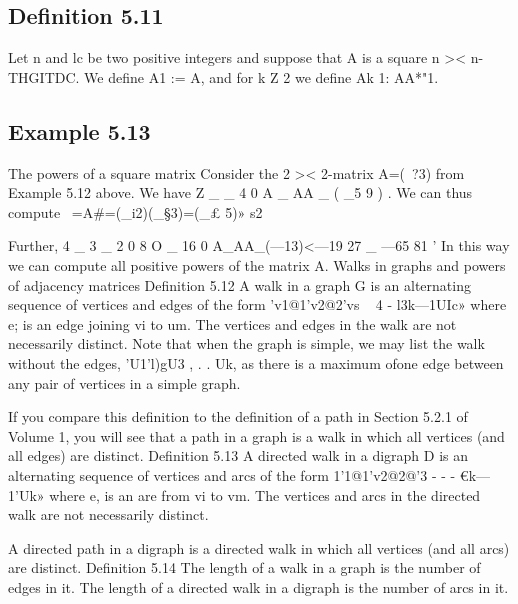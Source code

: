 ﻿\documentclass{beamer}
\begin{document}
\subsection*{Definition 5.11} Let n and lc be two positive integers and suppose that A
is a square n >< n-THGITDC. We deﬁne
A1 := A,
and for k Z 2 we deﬁne
Ak 1: AA*"1.
\subsection{Example 5.13} The powers of a square matrix
Consider the 2 >< 2-matrix
A=(~?3)
from Example 5.12 above. We have
Z _ _ 4 0
A _ AA _ ( _5 9 ) .
We can thus compute
~=A#=(_i2)(_§3)=(_£ 5)»
s2



Further,
4 _ 3 _ 2 0 8 O _ 16 0
A_AA_(—13)<—19 27 _ —65 81 '
In this way we can compute all positive powers of the matrix A.
Walks in graphs and powers of adjacency matrices
Definition 5.12 A walk in a graph G is an alternating sequence of
vertices and edges of the form
’v1@1'v2@2’vs ~ 4 - l3k—1UIc»
where e; is an edge joining vi to um. The vertices and edges in the
walk are not necessarily distinct.
Note that when the graph is simple, we may list the walk without the
edges,
’U1'l)gU3 , . . Uk,
as there is a maximum ofone edge between any pair of vertices in a
simple graph.


If you compare this deﬁnition to the deﬁnition of a path in Section
5.2.1 of Volume 1, you will see that a path in a graph is a walk in
which all vertices (and all edges) are distinct.
Definition 5.13 A directed walk in a digraph D is an alternating
sequence of vertices and arcs of the form
1'1@1'v2@2@'3 - - - €k—1'Uk»
where e, is an are from vi to vm. The vertices and arcs in the directed
walk are not necessarily distinct.


A directed path in a digraph is a directed walk in which all vertices
(and all arcs) are distinct.
Definition 5.14 The length of a walk in a graph is the number of edges
in it. The length of a directed walk in a digraph is the number of
arcs in it.

\end{document}
